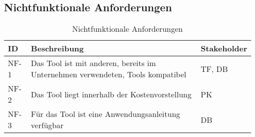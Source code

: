 \subsection{Nichtfunktionale Anforderungen}
\label{subsec:nichtfunktional}

\begin{table}[H]
    {
        \begin{tabularx}{\linewidth}{|p{1cm}|X|p{2cm}|}
            \hline
            ID
             & Beschreibung
             & Stakeholder
            \\
            \hline
            \cline{1-3}
            NF-1
             & Das Tool ist mit anderen, bereits im Unternehmen verwendeten, Tools kompatibel
             & TF, DB
            \\
            \cline{1-3}
            NF-2
             & Das Tool liegt innerhalb der Kostenvorstellung
             & PK
            \\
            \cline{1-3}
            NF-3
             & Für das Tool ist eine Anwendungsanleitung verfügbar
             & DB
            \\
            \hline
        \end{tabularx}
    }
    \caption{Nichtfunktionale Anforderungen}
    \label{tab:nichtfunktional}
\end{table}